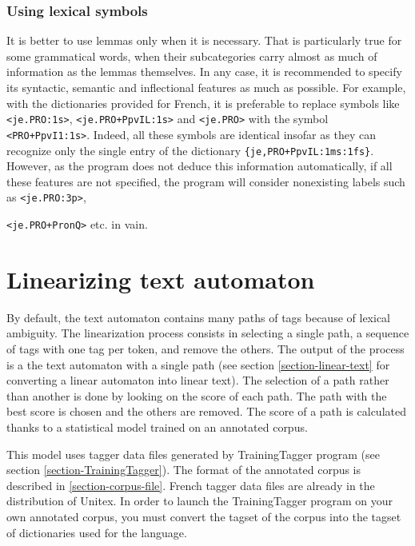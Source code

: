 \subsubsection{Using lexical symbols}

It is better to use lemmas only when it is necessary. That is particularly true
for some grammatical words, when their subcategories carry almost as much of
information as the lemmas themselves. In any case, it is recommended to specify
its syntactic, semantic and inflectional features as much as possible. For
example, with the dictionaries provided for French, it is preferable to replace
symbols like \verb$<je.PRO:1s>$, \verb$<je.PRO+PpvIL:1s>$ and \verb$<je.PRO>$
with the symbol \verb$<PRO+PpvI1:1s>$. Indeed, all these symbols are identical
insofar as they can recognize only the single entry of the dictionary
\verb${je,PRO+PpvIL:1ms:1fs}$. However, as the program does not deduce this
information automatically, if all these features are not specified, the program
will consider nonexisting labels such as \verb$<je.PRO:3p>$, 

\noindent \verb$<je.PRO+PronQ>$ etc. in vain.


\section{Linearizing text automaton}
\label{section-linearization}
By default, the text automaton contains many paths of tags because of lexical ambiguity.
The linearization process consists in 
selecting a single path, a sequence of tags with one tag per token, and remove the others. 
The output of the process is a the text automaton with a single path (see section \ref{section-linear-text}
for converting a linear automaton into linear text). The selection of a path rather than 
another is done by looking on the score of each path. The path with the best score is chosen 
and the others are removed. The score of a path is calculated thanks to a statistical model trained
on an annotated corpus. 

\bigskip
\noindent This model uses tagger data files generated by TrainingTagger program 
(see section \ref{section-TrainingTagger}). The format of the annotated corpus is described 
in \ref{section-corpus-file}. French tagger data files are already in the distribution of Unitex.
In order to launch the TrainingTagger program on your own annotated corpus, you must
convert the tagset of the corpus into the tagset of dictionaries used for the language. 

